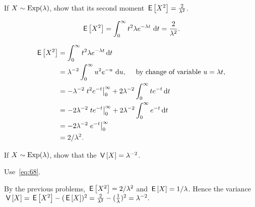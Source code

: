 \begin{extra}\label{ex:15} 
  If $X\sim\operatorname{Exp}(\lambda)$, show that its second moment $\,\mathsf{E}\left[X^2\right] =  \frac{2}{\lambda^2}$.
  \begin{hint}
  \begin{equation*}
  \,\mathsf{E}\left[X^2\right]= \int_0^\infty t^2 \lambda e^{-\lambda t}\, \,\text{d}t =  \frac{2}{\lambda^2}.
  \end{equation*}
  \end{hint}
  \begin{solution}
    \begin{align*}
\,\mathsf{E}\left[X^2\right] 
&= \int_0^\infty t^2 \lambda e^{-\lambda t} \,\text{d}t \\
&=   \lambda^{-2} \int_0^\infty u^2 e^{-u}\, \,\text{d}u, \quad \text{ by  change of variable $u=\lambda t$},   \\
&= -\lambda^{-2}\left. t^2 e^{- t}\right|_0^\infty + 2\lambda^{-2}\int_0^\infty t e^{- t} \,\text{d}t \\
&=  -2\lambda^{-2}\left. t e^{- t}\right|_0^\infty + 2\lambda^{-2} \int_0^\infty e^{- t} \,\text{d}t\\
&=  - 2\lambda^{-2} \left. e^{- t} \right|_0^\infty \\
&=  2/\lambda^2.
    \end{align*}
  \end{solution}
\end{extra}


\begin{extra}
  If $X\sim\operatorname{Exp}(\lambda)$, show that the 
$\,\mathsf{V}\left[X\right] = \lambda^{-2}$.
\begin{hint} Use~\cref{eq:68}. 
  \end{hint}
  \begin{solution}
    By the previous problems, $\,\mathsf{E}\left[X^2\right]=2/\lambda^2$ and $\,\mathsf{E}\left[X\right] = 1/\lambda$. Hence the variance $\,\mathsf{V}\left[X\right] = \,\mathsf{E}\left[X^2\right] - (\,\mathsf{E}\left[X\right])^2 = \frac{2}{\lambda^2} - (\frac{1}{\lambda})^2 = \lambda^{-2}.$
  \end{solution}
\end{extra}


